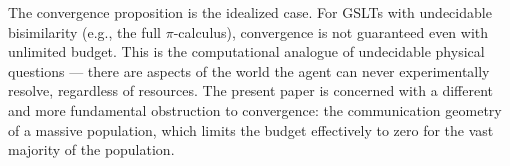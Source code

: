 \begin{remark}
The convergence proposition is the idealized case.
For GSLTs with undecidable bisimilarity (e.g., the full
$\pi$-calculus), convergence is not guaranteed even with
unlimited budget.
This is the computational analogue of undecidable physical questions ---
there are aspects of the world the agent can never experimentally resolve,
regardless of resources.
The present paper is concerned with a different and more fundamental
obstruction to convergence: the communication geometry of a massive
population, which limits the budget effectively to zero for the
vast majority of the population.
\end{remark}

